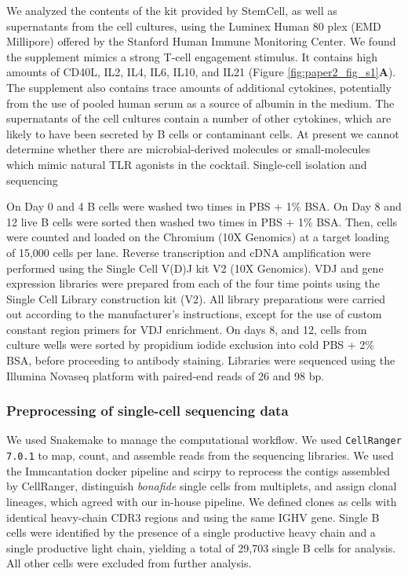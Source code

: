 We analyzed the contents of the kit provided by StemCell, as well as supernatants from the cell cultures, using the Luminex Human 80 plex (EMD Millipore) offered by the Stanford Human Immune Monitoring Center. We found the supplement mimics a strong T-cell engagement stimulus. It contains high amounts of CD40L, IL2, IL4, IL6, IL10, and IL21 (Figure \ref{fig:paper2_fig_s1}\textbf{A}). The supplement also contains trace amounts of additional cytokines, potentially from the use of pooled human serum as a source of albumin in the medium. The supernatants of the cell cultures contain a number of other cytokines, which are likely to have been secreted by B cells or contaminant cells. At present we cannot determine whether there are microbial-derived molecules or small-molecules which mimic natural TLR agonists in the cocktail.
Single-cell isolation and sequencing

On Day 0 and 4 B cells were washed two times in PBS + 1\% BSA. On Day 8 and 12 live B cells were sorted then washed two times in PBS + 1\% BSA. Then, cells were counted and loaded on the Chromium (10X Genomics) at a target loading of 15,000 cells per lane. Reverse transcription and cDNA amplification were performed using the Single Cell V(D)J kit V2 (10X Genomics). VDJ and gene expression libraries were prepared from each of the four time points using the Single Cell Library construction kit (V2). All library preparations were carried out according to the manufacturer’s instructions, except for the use of custom constant region primers\cite{horns_lineage_2016} for VDJ enrichment. On days 8, and 12, cells from culture wells were sorted by propidium iodide exclusion into cold PBS + 2\% BSA, before proceeding to antibody staining. Libraries were sequenced using the Illumina Novaseq platform with paired-end reads of 26 and 98 bp.

\subsubsection{Preprocessing of single-cell sequencing data}

We used Snakemake\cite{koster2012snakemake} to manage the computational workflow. We used \newline\verb|CellRanger 7.0.1| to map, count, and assemble reads from the sequencing libraries. We used the Immcantation docker\cite{gupta_change-o_2015} pipeline and scirpy\cite{sturm_scirpy_2020} to reprocess the contigs assembled by CellRanger, distinguish \textit{bonafide} single cells from multiplets, and assign clonal lineages, which agreed with our in-house pipeline\cite{croote_high-affinity_2018}. We defined clones as cells with identical heavy-chain CDR3 regions and using the same IGHV gene. Single B cells were identified by the presence of a single productive heavy chain and a single productive light chain, yielding a total of 29,703 single B cells for analysis. All other cells were excluded from further analysis.
